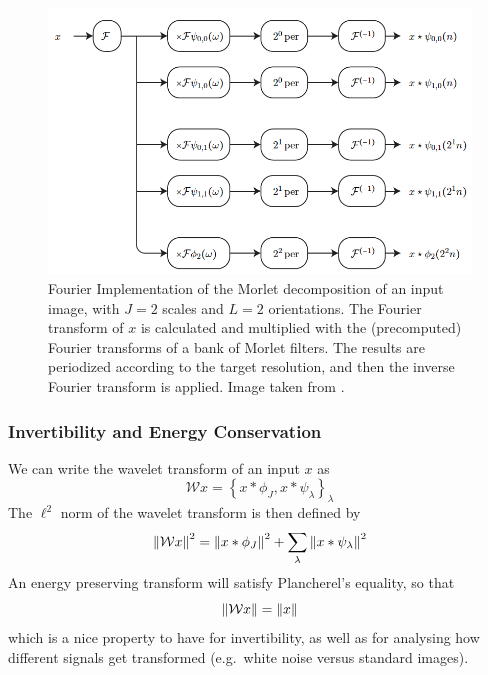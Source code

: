   \begin{figure}
    \centering
      \includegraphics[width=\textwidth]{litreview/images/morlet_fourier_process.png}
      \caption[Fourier Implementation of the Morlet decomposition of an input
              image]
              {Fourier Implementation of the Morlet decomposition of an input
              image, with $J=2$ scales and $L=2$ orientations. The Fourier
              transform of $x$ is calculated and multiplied with the
              (precomputed) Fourier transforms of a bank of Morlet filters. The
              results are periodized according to the target resolution, and
              then the inverse Fourier transform is applied. Image taken from
              \citep{sifre_rigid-motion_2014-1}.}
      \label{fig:morlet_fourier_process}
  \end{figure}

\subsubsection{Invertibility and Energy Conservation}
  We can write the wavelet transform of an input $x$ as 
  \begin{equation}
    \mathcal{W}x = \left\{x \ast \phi_J, x \ast \psi_{\lambda}
    \right\}_{\lambda}
  \end{equation}
  The $\ell^2$ norm of the wavelet transform is then defined by
  \begin{equation}
    \left\lVert \mathcal{W}x \right\rVert^2 = \left\lVert x\ast\phi_J \right\rVert^2 + \sum_{\lambda}\left\lVert x \ast
      \psi_\lambda \right\rVert^2
  \end{equation}
  An energy preserving transform will satisfy Plancherel's equality, so that
  \begin{equation}
    \left\lVert \mathcal{W}x \right\rVert = \left\lVert x \right\rVert
  \end{equation}
  which is a nice property to have for invertibility, as well as for analysing
  how different signals get transformed (e.g.\ white noise versus standard
  images).
  
